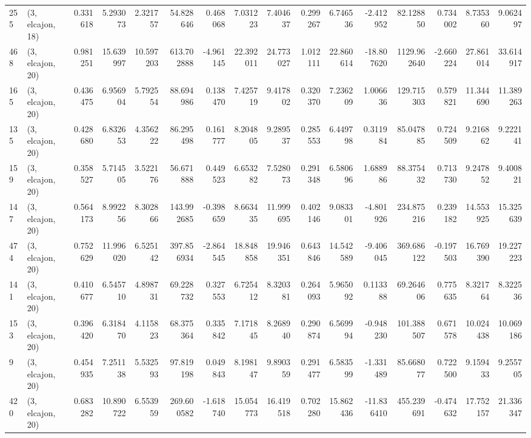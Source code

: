 \begin{tabular}{llrrrrrrrrrrrrrr}
255 &  (3, elcajon, 18) &   0.331618 &   5.293073 &   2.321757 &    54.828646 &   0.468068 &   7.031223 &   7.404637 &  0.299267 &   6.746536 &  -2.412952 &     82.128850 &    0.734002 &    8.735360 &    9.062497 \\
468 &  (3, elcajon, 20) &   0.981251 &  15.639997 &  10.597203 &   613.702888 &  -4.961145 &  22.392011 &  24.773027 &  1.012111 &  22.860614 & -18.807620 &   1129.962640 &   -2.660224 &   27.861014 &   33.614917 \\
165 &  (3, elcajon, 20) &   0.436475 &   6.956904 &   5.792554 &    88.694986 &   0.138470 &   7.425719 &   9.417802 &  0.320370 &   7.236209 &   1.006636 &    129.715303 &    0.579821 &   11.344690 &   11.389263 \\
135 &  (3, elcajon, 20) &   0.428680 &   6.832653 &   4.356222 &    86.295498 &   0.161777 &   8.204805 &   9.289537 &  0.285553 &   6.449798 &   0.311984 &     85.047885 &    0.724509 &    9.216862 &    9.222141 \\
159 &  (3, elcajon, 20) &   0.358527 &   5.714505 &   3.522176 &    56.671888 &   0.449523 &   6.653282 &   7.528073 &  0.291348 &   6.580696 &   1.688986 &     88.375432 &    0.713730 &    9.247852 &    9.400821 \\
147 &  (3, elcajon, 20) &   0.564173 &   8.992256 &   8.302866 &   143.992685 &  -0.398659 &   8.663435 &  11.999695 &  0.402146 &   9.083301 &  -4.801926 &    234.875216 &    0.239182 &   14.553925 &   15.325639 \\
474 &  (3, elcajon, 20) &   0.752629 &  11.996020 &   6.525142 &   397.856934 &  -2.864545 &  18.848858 &  19.946351 &  0.643846 &  14.542589 &  -9.406045 &    369.686122 &   -0.197503 &   16.769390 &   19.227223 \\
141 &  (3, elcajon, 20) &   0.410677 &   6.545710 &   4.898731 &    69.228732 &   0.327553 &   6.725412 &   8.320381 &  0.264093 &   5.965092 &   0.113388 &     69.264606 &    0.775635 &    8.321764 &    8.322536 \\
153 &  (3, elcajon, 20) &   0.396420 &   6.318470 &   4.115823 &    68.375364 &   0.335842 &   7.171845 &   8.268940 &  0.290874 &   6.569994 &  -0.948230 &    101.388507 &    0.671578 &   10.024438 &   10.069186 \\
9   &  (3, elcajon, 20) &   0.454935 &   7.251138 &   5.532593 &    97.819198 &   0.049843 &   8.198147 &   9.890359 &  0.291477 &   6.583599 &  -1.331489 &     85.668077 &    0.722500 &    9.159433 &    9.255705 \\
420 &  (3, elcajon, 20) &   0.683282 &  10.890722 &   6.553959 &   269.600582 &  -1.618740 &  15.054773 &  16.419518 &  0.702280 &  15.862436 & -11.836410 &    455.239691 &   -0.474632 &   17.752157 &   21.336347 \\

\end{tabular}
